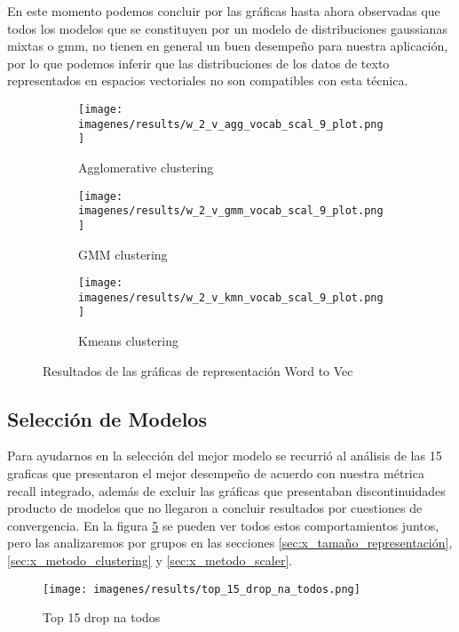 \documentclass[12pt]{article}
\begin{document}
		En este momento podemos concluir por las gráficas hasta ahora observadas que todos los modelos que se constituyen por un modelo de distribuciones gaussianas mixtas o gmm, no tienen en general un buen desempeño para nuestra aplicación, por lo que podemos inferir que las distribuciones de los datos de texto representados en espacios vectoriales no son compatibles con esta técnica. 
			\begin{figure}[h]
			\centering\begin{subfigure}[b]{0.5\linewidth} 
				\centering\texttt{[image: imagenes/results/w\_2\_v\_agg\_vocab\_scal\_9\_plot.png]} 
				\caption{\label{fig:w2v_agg_vocab_scal_9}Agglomerative clustering} 
			\end{subfigure}\hfill
			\begin{subfigure}[b]{0.5\linewidth} 
				\centering\texttt{[image: imagenes/results/w\_2\_v\_gmm\_vocab\_scal\_9\_plot.png]} 
				\caption{\label{fig:w2v_gmm_vocab_scal_9}GMM clustering} 
			\end{subfigure}\vspace{10pt}
			
			\begin{subfigure}[b]{\linewidth} 
				\centering\texttt{[image: imagenes/results/w\_2\_v\_kmn\_vocab\_scal\_9\_plot.png]} 
				\caption{\label{fig:w2v_kmn_vocab_scal_9}Kmeans clustering} 
			\end{subfigure} 
			\caption{Resultados de las gráficas de representación Word to Vec} 
			\label{fig:w_2_v_results}
			\end{figure}
		
		
		\subsection{Selección de Modelos}
		Para ayudarnos en la selección del mejor modelo se recurrió al análisis de las 15 graficas que presentaron el mejor desempeño de acuerdo con nuestra métrica recall integrado, además de excluir las gráficas que presentaban discontinuidades producto de modelos que no llegaron a concluir resultados por cuestiones de convergencia. En la figura \ref{fig:top_15_drop_na_todos} se pueden ver todos estos comportamientos juntos, pero las analizaremos por grupos en las secciones \ref{sec:x_tamaño_representación},  \ref{sec:x_metodo_clustering} y \ref{sec:x_metodo_scaler}.

		\begin{figure}[htp]
			\texttt{[image: imagenes/results/top\_15\_drop\_na\_todos.png]}
			\centering
			\caption{Top 15 drop na todos}
			
			\label{fig:top_15_drop_na_todos}
		\end{figure}
		
\end{document}
